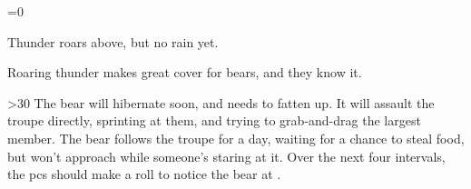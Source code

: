\ifnum\value{cycle}=0


\begin{boxtext}
  Thunder roars above, but no rain yet.
\end{boxtext}

Roaring thunder makes great cover for bears, and they know it.

\bear

\ifnum\value{fenestraDay}>30
  The bear will hibernate soon, and needs to fatten up.
  It will assault the troupe directly, sprinting at them, and trying to grab-and-drag the largest member.
\else
  The bear follows the troupe for a day, waiting for a chance to steal food, but won't approach while someone's staring at it.
  Over the next four \glspl{interval}, the \glspl{pc} should make a  roll to notice the bear at
  \tn.
\fi

\fi

